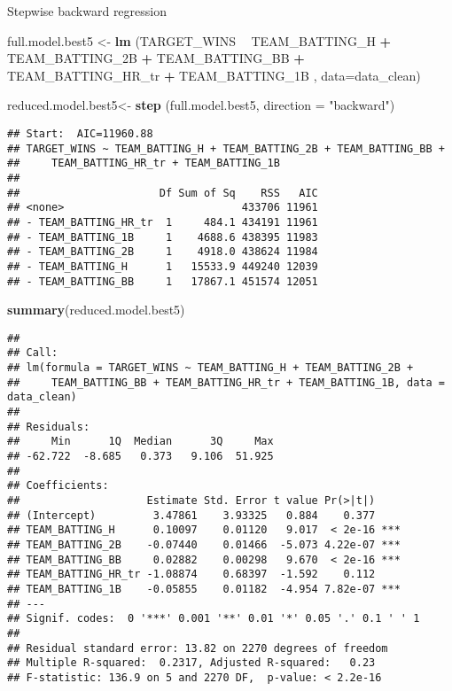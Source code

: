 \documentclass[]{article}
\newenvironment{Shaded}{\begin{snugshade}}{\end{snugshade}}
\newcommand{\KeywordTok}[1]{\textcolor[rgb]{0.13,0.29,0.53}{\textbf{#1}}}
\newcommand{\DataTypeTok}[1]{\textcolor[rgb]{0.13,0.29,0.53}{#1}}
\newcommand{\StringTok}[1]{\textcolor[rgb]{0.31,0.60,0.02}{#1}}
\newcommand{\OperatorTok}[1]{\textcolor[rgb]{0.81,0.36,0.00}{\textbf{#1}}}
\newcommand{\NormalTok}[1]{#1}
\begin{document}
Stepwise backward regression

\begin{Shaded}
\begin{Highlighting}[]
\NormalTok{full.model.best5 <-}\StringTok{ }\KeywordTok{lm}\NormalTok{ (TARGET_WINS }\OperatorTok{~}\StringTok{     }\NormalTok{TEAM_BATTING_H }\OperatorTok{+}\StringTok{ }\NormalTok{TEAM_BATTING_2B }\OperatorTok{+}\StringTok{ }\NormalTok{TEAM_BATTING_BB }\OperatorTok{+}\StringTok{ }\NormalTok{TEAM_BATTING_HR_tr }\OperatorTok{+}\StringTok{ }\NormalTok{TEAM_BATTING_1B , }\DataTypeTok{data=}\NormalTok{data_clean)}

\NormalTok{reduced.model.best5<-}\StringTok{ }\KeywordTok{step}\NormalTok{ (full.model.best5, }\DataTypeTok{direction =} \StringTok{"backward"}\NormalTok{)    }
\end{Highlighting}
\end{Shaded}

\begin{verbatim}
## Start:  AIC=11960.88
## TARGET_WINS ~ TEAM_BATTING_H + TEAM_BATTING_2B + TEAM_BATTING_BB + 
##     TEAM_BATTING_HR_tr + TEAM_BATTING_1B
## 
##                      Df Sum of Sq    RSS   AIC
## <none>                            433706 11961
## - TEAM_BATTING_HR_tr  1     484.1 434191 11961
## - TEAM_BATTING_1B     1    4688.6 438395 11983
## - TEAM_BATTING_2B     1    4918.0 438624 11984
## - TEAM_BATTING_H      1   15533.9 449240 12039
## - TEAM_BATTING_BB     1   17867.1 451574 12051
\end{verbatim}

\begin{Shaded}
\begin{Highlighting}[]
\KeywordTok{summary}\NormalTok{(reduced.model.best5)}
\end{Highlighting}
\end{Shaded}

\begin{verbatim}
## 
## Call:
## lm(formula = TARGET_WINS ~ TEAM_BATTING_H + TEAM_BATTING_2B + 
##     TEAM_BATTING_BB + TEAM_BATTING_HR_tr + TEAM_BATTING_1B, data = data_clean)
## 
## Residuals:
##     Min      1Q  Median      3Q     Max 
## -62.722  -8.685   0.373   9.106  51.925 
## 
## Coefficients:
##                    Estimate Std. Error t value Pr(>|t|)    
## (Intercept)         3.47861    3.93325   0.884    0.377    
## TEAM_BATTING_H      0.10097    0.01120   9.017  < 2e-16 ***
## TEAM_BATTING_2B    -0.07440    0.01466  -5.073 4.22e-07 ***
## TEAM_BATTING_BB     0.02882    0.00298   9.670  < 2e-16 ***
## TEAM_BATTING_HR_tr -1.08874    0.68397  -1.592    0.112    
## TEAM_BATTING_1B    -0.05855    0.01182  -4.954 7.82e-07 ***
## ---
## Signif. codes:  0 '***' 0.001 '**' 0.01 '*' 0.05 '.' 0.1 ' ' 1
## 
## Residual standard error: 13.82 on 2270 degrees of freedom
## Multiple R-squared:  0.2317, Adjusted R-squared:   0.23 
## F-statistic: 136.9 on 5 and 2270 DF,  p-value: < 2.2e-16
\end{verbatim}
\end{document}
